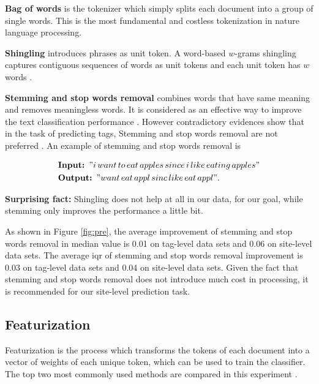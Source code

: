 \documentclass{sig-alternate-05-2015}
\begin{document}
\textbf{Bag of words} is the tokenizer which simply splits each document into a group of single words. This is the most fundamental and costless tokenization in nature language processing.

\textbf{Shingling} introduces phrases as unit token. A word-based $w$-grams shingling captures contiguous sequences of words as unit tokens and each unit token has $w$ words \cite{chang2009using}.

\textbf{Stemming and stop words removal} combines words that have same meaning and removes meaningless words. It is considered as an effective way to improve the text classification performance \cite{yang1997comparative}. However contradictory evidences show that in the task of predicting tags, Stemming and stop words removal are not preferred \cite{moharanatag,stanley2013predicting}. An example of stemming and stop words removal is

\begin{equation*}
    \begin{aligned}
    &\textbf{Input: }"i\,want\,to\,eat\,apples\,since\,i\,like\,eating\,apples"\\
    &\textbf{Output: }"want\, eat\, appl\, sinc\, like\, eat\, appl".
    \end{aligned}
\end{equation*}




\textbf{Surprising fact:} Shingling does not help at all in our data, for our goal, while stemming only improves the performance a little bit. 

As shown in Figure \ref{fig:pre}, the average improvement of stemming and stop words removal in median value is 0.01 on tag-level data sets and 0.06 on site-level data sets. The average iqr of stemming and stop words removal improvement is 0.03 on tag-level data sets and 0.04 on site-level data sets. Given the fact that stemming and stop words removal does not introduce much cost in processing, it is recommended for our site-level prediction task.

\subsection{Featurization}

Featurization is the process which transforms the tokens of each document into a vector of weights of each unique token, which can be used to train the classifier. The top two most commonly used methods are compared in this experiment \cite{manning1999foundations}. 
\end{document}
